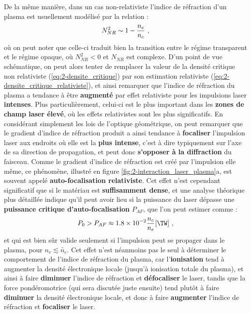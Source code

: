 \begin{refsection}
De la même manière, dans un cas non-relativiste l'indice de réfraction d'un plasma est usuellement modélisé par la relation \parencite{macchi_2012} :
\begin{equation}
    N_{NR}^2 \sim 1-\dfrac{n_e}{n_c} ~ \rm ,
    \label{eq:2-indice_optique_plasma}
\end{equation}
où on peut noter que celle-ci traduit bien la transition entre le régime transparent et le régime opaque, où $N_{NR}^2<0$ et $N_{NR}$ est complexe. 
D'un point de vue schématique, on peut alors tenter de remplacer la valeur de la densité critique non relativiste (\ref{eq:2-densite_critique}) par son estimation relativiste (\ref{eq:2-densite_critique_relativiste}), et ainsi remarquer que l'indice de réfraction du plasma a tendance à être \textbf{augmenté} par effet relativiste pour les impulsions laser \textbf{intenses}. Plus particulièrement, celui-ci est le plus important dans les \textbf{zones de champ laser élevé}, où les effets relativistes sont les plus significatifs. 
En considérant simplement les lois de l'optique géométrique, on peut remarquer que le gradient d'indice de réfraction produit a ainsi tendance à \textbf{focaliser} l'impulsion laser aux endroits où elle est la \textbf{plus intense}, c'est à dire typiquement sur l'axe de sa direction de propagation, et peut donc \textbf{s'opposer à la diffraction} du faisceau. Comme le gradient d'indice de réfraction est créé par l'impulsion elle même, ce phénomène, illustré en figure \ref{fig:2-interaction_laser_plasma}a, est souvent appelé \textbf{auto-focalisation relativiste}. Cet effet n'est cependant significatif que si le matériau est \textbf{suffisamment dense}, et une analyse théorique plus détaillée indique qu'il peut avoir lieu si la puissance du laser dépasse une \textbf{puissance critique d'auto-focalisation} $P_{AF}$, que l'on peut estimer comme \parencite{macchi_2012} :
\begin{equation}
    P_0 > P_{AF}\approx 1.8 \times 10^{-2} \dfrac{n_c}{n_e} \si{[\TW]} ~ \rm ,
    \label{eq:2-seuil_auto-focalisation}
\end{equation}
et qui est bien sûr valide seulement si l'impulsion peut se propager dans le plasma, pour $n_e \lesssim \tilde{n_c}$. Cet effet n'est néanmoins pas le seul à déterminer le comportement de l'indice de réfraction du plasma, car l'\textbf{ionisation} tend à augmenter la densité électronique locale (jusqu'à ionisation totale du plasma), et ainsi à faire \textbf{diminuer} l'indice de réfraction et \textbf{défocaliser} le laser, tandis que la force pondéromotrice (qui sera discutée juste ensuite) tend plutôt à faire \textbf{diminuer} la densité électronique locale, et donc à faire \textbf{augmenter} l'indice de réfraction et \textbf{focaliser} le laser.


\end{refsection}
